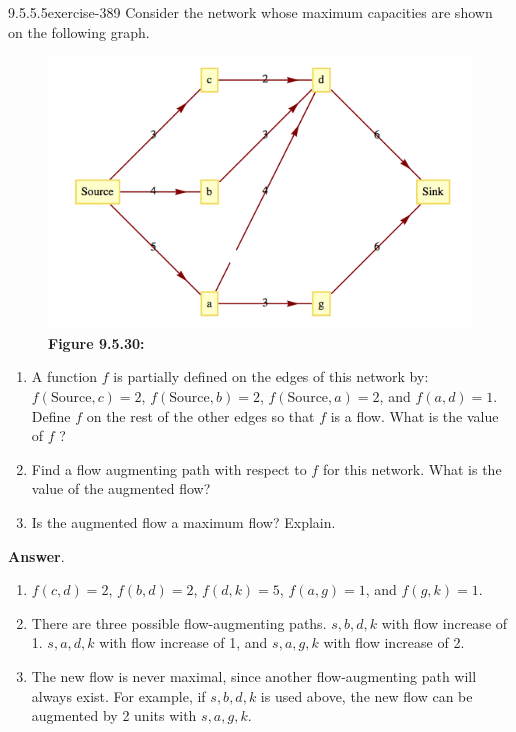\documentclass[twoside,10pt,]{book}
\numberwithin{equation}{section}
\begin{document}
\begin{divisionsolution}{9.5.5.5}{}{exercise-389}%
\hypertarget{p-3397}{}%
Consider the network whose maximum capacities are shown on the following graph.%
\begin{figure}
\centering
\includegraphics[width=1\linewidth]{images/fig-exercise-9-5-5.png}
\caption*{\textbf{Figure 9.5.30:} }
\end{figure}
\hypertarget{p-3398}{}%
\leavevmode%
\begin{enumerate}[label=(\alph*)]
\item\hypertarget{li-1597}{}\hypertarget{p-3399}{}%
A function \(f\) is partially defined on the edges of this network by: \(f(\text{Source}, c) =2\), \(f(\text{Source}, b) =2\), \(f(\text{Source}, a) = 2\), and \(f(a, d) = 1\).  Define \(f\) on the rest of the other edges so that \(f\) is a flow. What is the value of  \(f\) ?%
\item\hypertarget{li-1598}{}\hypertarget{p-3400}{}%
Find a flow augmenting path with respect to \(f\) for this network. What is the value of the augmented flow?%
\item\hypertarget{li-1599}{}\hypertarget{p-3401}{}%
Is the augmented flow a maximum flow? Explain.%
\end{enumerate}
%
\par\smallskip%
\noindent\textbf{Answer}.\quad%
\hypertarget{p-3402}{}%
\leavevmode%
\begin{enumerate}[label=(\alph*)]
\item\hypertarget{li-1600}{}\hypertarget{p-3403}{}%
\(f(c,d)=2\), \(f(b,d)=2\), \(f(d,k)=5\), \(f(a,g)=1\), and \(f(g,k)=1\).%
\item\hypertarget{li-1601}{}\hypertarget{p-3404}{}%
There are three possible flow-augmenting paths. \(s,b,d,k\) with flow increase of 1. \(s,a,d,k\) with flow increase of 1, and \(s,a,g,k\) with flow increase of 2.%
\item\hypertarget{li-1602}{}\hypertarget{p-3405}{}%
The new flow is never maximal, since another flow-augmenting path will always exist. For example, if \(s,b,d,k\) is used above, the new flow can be augmented by 2 units with \(s,a,g,k\).%
\end{enumerate}
%
\end{divisionsolution}%
\end{document}
